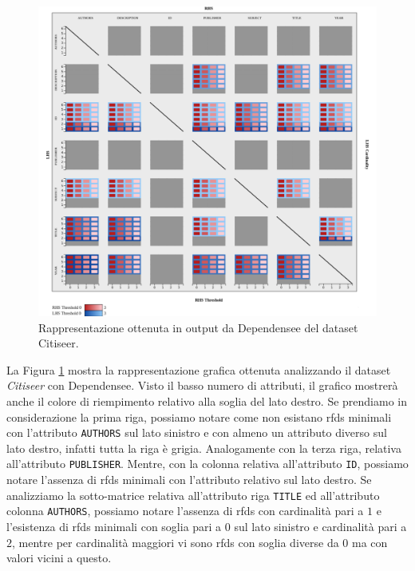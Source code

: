\begin{figure}[ht]
    \centering
    \includegraphics[width=\linewidth]{capitoli/figure/citiseer_2000_result}
    \caption{Rappresentazione ottenuta in output da Dependensee del dataset Citiseer.}
    \label{fig:citiseer_2000_result}
\end{figure}
La Figura \ref{fig:citiseer_2000_result} mostra la rappresentazione grafica ottenuta analizzando il dataset \textit{Citiseer} con Dependensee. Visto il basso numero di attributi, il grafico mostrer\`{a} anche il colore di riempimento relativo alla soglia del lato destro. Se prendiamo in considerazione la prima riga, possiamo notare come non esistano \acrlong{rfds} minimali con l'attributo \texttt{AUTHORS} sul lato sinistro e con almeno un attributo diverso sul lato destro, infatti tutta la riga \`{e} grigia. Analogamente con la terza riga, relativa all'attributo \texttt{PUBLISHER}. Mentre, con la colonna relativa all'attributo \texttt{ID}, possiamo notare l'assenza di \acrlong{rfds} minimali con l'attributo relativo sul lato destro. Se analizziamo la sotto-matrice relativa all'attributo riga \texttt{TITLE} ed all'attributo colonna \texttt{AUTHORS}, possiamo notare l'assenza di \acrlong{rfds} con cardinalit\`{a} pari a $1$ e l'esistenza di \acrlong{rfds} minimali con soglia pari a $0$ sul lato sinistro e cardinalit\`{a} pari a $2$, mentre per cardinalit\`{a} maggiori vi sono \acrlong{rfds} con soglia diverse da $0$ ma con valori vicini a questo.
